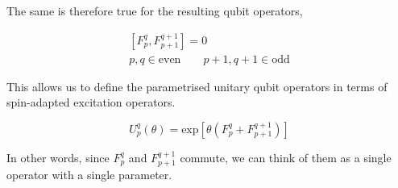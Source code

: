 The same is therefore true for the resulting qubit operators,

\begin{equation*}
\begin{gathered}
    \left[ F_p^q, F_{p+1}^{q+1} \right] = 0 \\
    p, q \in \text{even} \qquad p+1, q+1 \in \text{odd}
\end{gathered}
\end{equation*}

This allows us to define the parametrised unitary qubit operators in terms of spin-adapted excitation operators.

\begin{equation*}
    U^q_p (\theta) = \text{exp}
    \left[ \theta \left( F_p^q + F_{p+1}^{q+1} \right) \right]
\end{equation*}

In other words, since $F_p^q$ and $F_{p+1}^{q+1}$ commute, we can think of them as a single operator with a single parameter.




